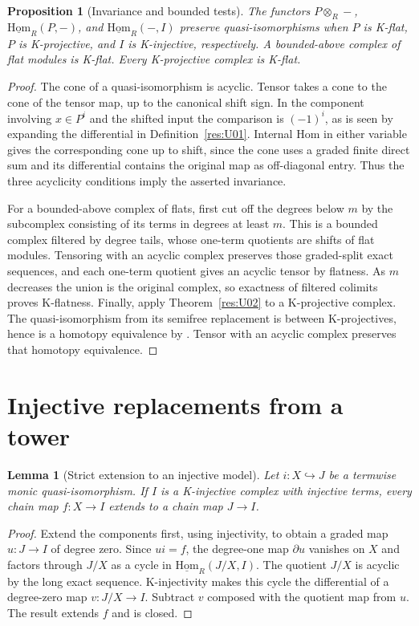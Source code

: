 \documentclass[11pt,oneside,openany]{book}
\newtheorem{lemma}[theorem]{Lemma}
\newtheorem{proposition}[theorem]{Proposition}
\theoremstyle{definition}
\theoremstyle{remark}
\begin{document}
\begin{proposition}[Invariance and bounded tests]\label{res:U03}
The functors \(P\otimes_R-\), \(\underline{\mathrm{Hom}}_R(P,-)\),
and \(\underline{\mathrm{Hom}}_R(-,I)\) preserve quasi-isomorphisms
when \(P\) is K-flat, \(P\) is K-projective, and \(I\) is
K-injective, respectively. A bounded-above complex of flat modules
is K-flat. Every K-projective complex is K-flat.
\end{proposition}
\begin{proof}
The cone of a quasi-isomorphism is acyclic. Tensor takes a cone to
the cone of the tensor map, up to the canonical shift sign.
In the component involving \(x\in P^i\) and the shifted input the
comparison is \((-1)^i\), as is seen by expanding the differential
in Definition~\ref{res:U01}. Internal Hom in either variable
gives the corresponding cone up to shift, since the cone uses
a graded finite direct sum and its differential contains the
original map as off-diagonal entry. Thus the three acyclicity
conditions imply the asserted invariance.

For a bounded-above complex of flats, first cut off the degrees
below \(m\) by the subcomplex consisting of its terms in degrees
at least \(m\). This is a bounded complex filtered by degree tails,
whose one-term quotients are shifts of flat modules. Tensoring with
an acyclic complex preserves those graded-split exact sequences,
and each one-term quotient gives an acyclic tensor by flatness.
As \(m\) decreases the union is the original complex, so exactness
of filtered colimits proves K-flatness. Finally, apply
Theorem~\ref{res:U02} to a K-projective complex. The quasi-isomorphism
from its semifree replacement is between K-projectives, hence is a
homotopy equivalence by \cite[R04]{ha-core}. Tensor with an acyclic
complex preserves that homotopy equivalence. 
\end{proof}

\section{Injective replacements from a tower}

\begin{lemma}[Strict extension to an injective model]\label{res:U04}
Let \(i:X\hookrightarrow J\) be a termwise monic quasi-isomorphism.
If \(I\) is a K-injective complex with injective terms, every
chain map \(f:X\to I\) extends to a chain map \(J\to I\).
\end{lemma}
\begin{proof}
Extend the components first, using injectivity, to obtain a graded
map \(u:J\to I\) of degree zero. Since \(u i=f\), the degree-one
map \(\partial u\) vanishes on \(X\) and factors through \(J/X\)
as a cycle in \(\underline{\mathrm{Hom}}_R(J/X,I)\).
The quotient \(J/X\) is acyclic by the long exact sequence.
K-injectivity makes this cycle the differential of a degree-zero
map \(v:J/X\to I\). Subtract \(v\) composed with the quotient
map from \(u\). The result extends \(f\) and is closed.
\end{proof}
\end{document}

